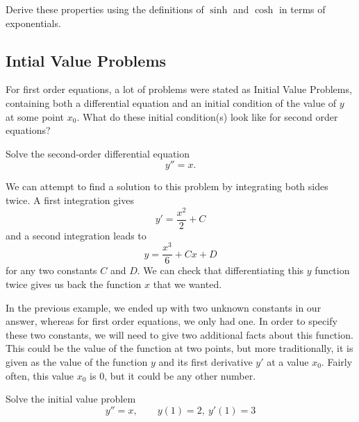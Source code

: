 \begin{exercise}
Derive these properties using the definitions of $\sinh$
and $\cosh$ in terms of exponentials.
\end{exercise}

\subsection{Intial Value Problems}

For first order equations, a lot of problems were stated as Initial Value Problems, containing both a differential equation and an initial condition of the value of $y$ at some point $x_0$. What do these initial condition(s) look like for second order equations?

\begin{example}
Solve the second-order differential equation
\begin{equation*}
y'' = x.
\end{equation*}
\end{example}

\begin{exampleSol}
We can attempt to find a solution to this problem by integrating both sides twice. A first integration gives
\begin{equation*}
y' = \frac{x^2}{2} + C
\end{equation*}
and a second integration leads to 
\begin{equation*}
y = \frac{x^3}{6} + Cx + D
\end{equation*}
for any two constants $C$ and $D$. We can check that differentiating this $y$ function twice gives us back the function $x$ that we wanted.
\end{exampleSol}

In the previous example, we ended up with two unknown constants in our answer, whereas for first order equations, we only had one. In order to specify these two constants, we will need to give two additional facts about this function. This could be the value of the function at two points, but more traditionally, it is given as the value of the function $y$ and its first derivative $y'$ at a value $x_0$. Fairly often, this value $x_0$ is $0$, but it could be any other number.

\begin{example}
Solve the initial value problem
\begin{equation*}
y'' = x, \qquad y(1) = 2,\ y'(1) = 3
\end{equation*}
\end{example}

